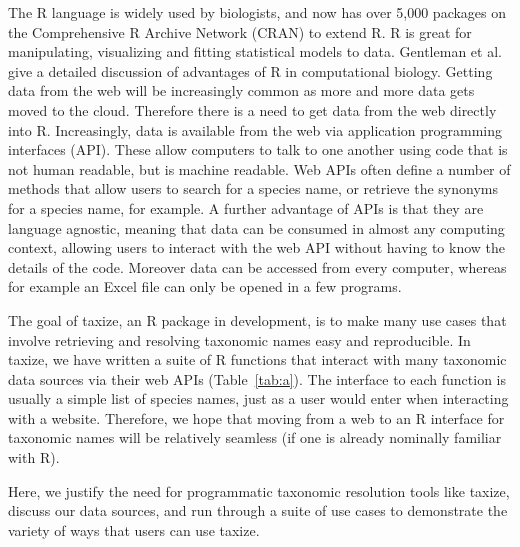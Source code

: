 \documentclass[10pt,a4paper,twocolumn]{article}
\begin{document}
The R language is widely used by biologists, and now has over 5,000 packages on the Comprehensive R Archive Network (CRAN) to extend R. R is great for manipulating, visualizing and fitting statistical models to data. Gentleman et al. \cite{gentleman_bioconductor:_2004} give a detailed discussion of advantages of R in computational biology. Getting data from the web will be increasingly common as more and more data gets moved to the cloud. Therefore there is a need to get data from the web directly into R. Increasingly, data is available from the web via application programming interfaces (API). These allow computers to talk to one another using code that is not human readable, but is machine readable. Web APIs often define a number of methods that allow users to search for a species name, or retrieve the synonyms for a species name, for example. A further advantage of APIs is that they are language agnostic, meaning that data can be consumed in almost any computing context, allowing users to interact with the web API without having to know the details of the code. Moreover data can be accessed from every computer, whereas for example an Excel file can only be opened in a few programs. 

The goal of taxize, an R package in development, is to make many use cases that involve retrieving and resolving taxonomic names easy and reproducible. In taxize, we have written a suite of R functions that interact with many taxonomic data sources via their web APIs (Table~\ref{tab:a}). The interface to each function is usually a simple list of species names, just as a user would enter when interacting with a website. Therefore, we hope that moving from a web to an R interface for taxonomic names will be relatively seamless (if one is already nominally familiar with R). 

Here, we justify the need for programmatic taxonomic resolution tools like taxize, discuss our data sources, and run through a suite of use cases to demonstrate the variety of ways that users can use taxize.
\end{document}
